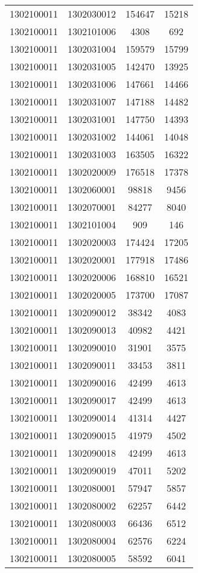 \begin{longtable}{llcc}
1302100011 & 1302030012 & 154647 & 15218\\
1302100011 & 1302101006 & 4308 & 692\\
1302100011 & 1302031004 & 159579 & 15799\\
1302100011 & 1302031005 & 142470 & 13925\\
1302100011 & 1302031006 & 147661 & 14466\\
1302100011 & 1302031007 & 147188 & 14482\\
1302100011 & 1302031001 & 147750 & 14393\\
1302100011 & 1302031002 & 144061 & 14048\\
1302100011 & 1302031003 & 163505 & 16322\\
1302100011 & 1302020009 & 176518 & 17378\\
1302100011 & 1302060001 & 98818 & 9456\\
1302100011 & 1302070001 & 84277 & 8040\\
1302100011 & 1302101004 & 909 & 146\\
1302100011 & 1302020003 & 174424 & 17205\\
1302100011 & 1302020001 & 177918 & 17486\\
1302100011 & 1302020006 & 168810 & 16521\\
1302100011 & 1302020005 & 173700 & 17087\\
1302100011 & 1302090012 & 38342 & 4083\\
1302100011 & 1302090013 & 40982 & 4421\\
1302100011 & 1302090010 & 31901 & 3575\\
1302100011 & 1302090011 & 33453 & 3811\\
1302100011 & 1302090016 & 42499 & 4613\\
1302100011 & 1302090017 & 42499 & 4613\\
1302100011 & 1302090014 & 41314 & 4427\\
1302100011 & 1302090015 & 41979 & 4502\\
1302100011 & 1302090018 & 42499 & 4613\\
1302100011 & 1302090019 & 47011 & 5202\\
1302100011 & 1302080001 & 57947 & 5857\\
1302100011 & 1302080002 & 62257 & 6442\\
1302100011 & 1302080003 & 66436 & 6512\\
1302100011 & 1302080004 & 62576 & 6224\\
1302100011 & 1302080005 & 58592 & 6041\\

\end{longtable}
